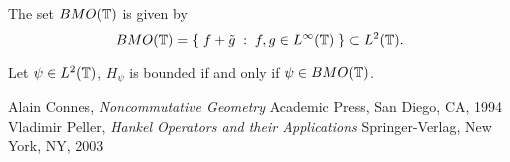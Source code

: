 \documentclass{unswmaths}
\begin{document}
\begin{definition}
    The set ${BMO}(\mathbb{T})$ is given by
    \begin{equation*}
        BMO(\mathbb{T}) = \{\;f+\tilde{g}\;:\;f,g \in L^\infty(\mathbb{T})\;\} \subset L^2(\mathbb{T}).
    \end{equation*}
\end{definition}

\begin{theorem}
    Let $\psi \in L^2(\mathbb{T})$, $H_\psi$ is bounded if and only if $\psi \in {BMO}(\mathbb{T})$.
\end{theorem}


\begin{thebibliography}{9}
    Alain Connes, 
    \emph{Noncommutative Geometry}
     Academic Press, 
     San Diego, 
     CA, 
     1994
    Vladimir Peller,
    \emph{Hankel Operators and their Applications}
    Springer-Verlag,
    New York, 
    NY,
    2003
    
\end{thebibliography}
\end{document}
